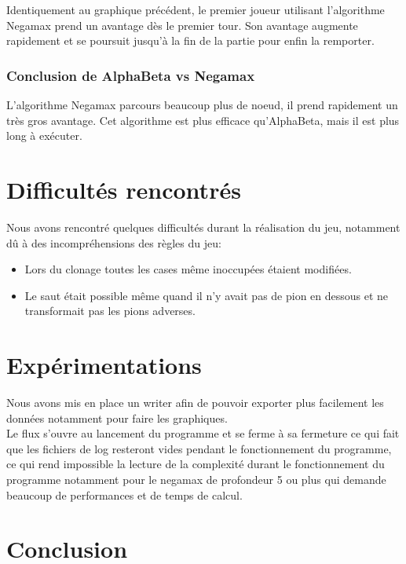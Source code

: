 \documentclass[12pt]{article}
\begin{document}
Identiquement au graphique précédent, le premier joueur utilisant l'algorithme Negamax prend un avantage dès le premier tour. Son avantage augmente rapidement et se poursuit jusqu'à la fin de la partie pour enfin la remporter.

\subsubsection{Conclusion de AlphaBeta vs Negamax}

L'algorithme Negamax parcours beaucoup plus de noeud, il prend rapidement un très gros avantage.
Cet algorithme est plus efficace qu'AlphaBeta, mais il est plus long à exécuter.

\newpage
\section{Difficultés rencontrés}

Nous avons rencontré quelques difficultés durant la réalisation du jeu, notamment dû à des incompréhensions des règles du jeu:\\

\begin{itemize}
    \item Lors du clonage toutes les cases même inoccupées étaient modifiées.
    \item Le saut était possible même quand il n'y avait pas de pion en dessous et ne transformait pas les pions adverses.
\end{itemize}

\section{Expérimentations}

Nous avons mis en place un writer afin de pouvoir exporter plus facilement les données notamment pour faire les graphiques.\\

Le flux s'ouvre au lancement du programme et se ferme à sa fermeture ce qui fait que les fichiers de log resteront vides pendant le fonctionnement du programme, ce qui rend impossible la lecture de la complexité durant le fonctionnement du programme notamment pour le negamax de profondeur 5 ou plus qui demande beaucoup de performances et de temps de calcul.


\section{Conclusion}
\end{document}

